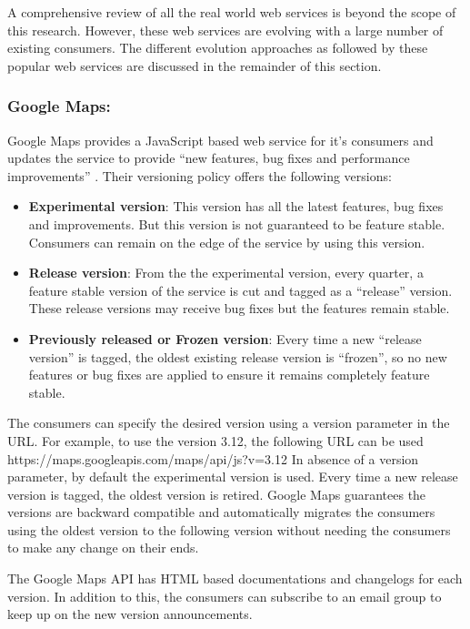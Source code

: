 \documentclass[runningheads,a4paper]{llncs}
\begin{document}
A comprehensive review of all the real world web services is beyond the scope of this research. However, these web services are evolving with a large number of existing consumers. The different evolution approaches as followed by these popular web services are discussed in the remainder of this section.

\subsubsection{Google Maps:}
Google Maps provides a JavaScript based web service for it’s consumers and updates the service to provide ``new features, bug fixes and performance improvements'' \cite{google_maps_versioning}. Their versioning policy offers the following versions:

\begin{itemize}
  \item \textbf{Experimental version}: This version has all the latest features, bug fixes and improvements. But this version is not guaranteed to be feature stable. Consumers can remain on the edge of the service by using this version.
  \item \textbf{Release version}: From the the experimental version, every quarter, a feature stable version of the service is cut and tagged as a ``release'' version. These release versions may receive bug fixes but the features remain stable.
  \item \textbf{Previously released or Frozen version}: Every time a new ``release version'' is tagged, the oldest existing release version is ``frozen'', so no new features or bug fixes are applied to ensure it remains completely feature stable.
\end{itemize}

The consumers can specify the desired version using a version parameter in the URL. For example, to use the version 3.12, the following URL can be used https://maps.googleapis.com/maps/api/js?v=3.12 In absence of a version parameter, by default the experimental version is used.
Every time a new release version is tagged, the oldest version is retired. Google Maps guarantees the versions are backward compatible and automatically migrates the consumers using the oldest version to the following version without needing the consumers to make any change on their ends.

The Google Maps API has HTML based documentations and changelogs for each version. In addition to this, the consumers can subscribe to an email group to keep up on the new version announcements.
\end{document}
